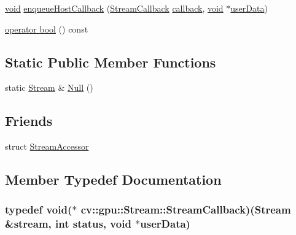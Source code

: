 \begin{DoxyCompactItemize}
\hyperlink{legacy_8hpp_a8bb47f092d473522721002c86c13b94e}{void} \hyperlink{classcv_1_1gpu_1_1Stream_aa1f21a082a9c7d280242b8861e9faf0f}{enqueue\-Host\-Callback} (\hyperlink{classcv_1_1gpu_1_1Stream_aaf3251f51e57223ddd46c62bd63af3eb}{Stream\-Callback} \hyperlink{highgui__c_8h_ad88d317ce299d78e0af7c341474a66cb}{callback}, \hyperlink{legacy_8hpp_a8bb47f092d473522721002c86c13b94e}{void} $\ast$\hyperlink{legacy_8hpp_ae6d7787b8c860038ffa2f009134ec73e}{user\-Data})
\item 
\hyperlink{classcv_1_1gpu_1_1Stream_a33ff19068eec638b8888b36a29d051c4}{operator bool} () const 
\end{DoxyCompactItemize}
\subsection*{Static Public Member Functions}
\begin{DoxyCompactItemize}
\item 
static \hyperlink{classcv_1_1gpu_1_1Stream}{Stream} \& \hyperlink{classcv_1_1gpu_1_1Stream_af96c23564834f88333dcb8997df553f1}{Null} ()
\end{DoxyCompactItemize}
\subsection*{Friends}
\begin{DoxyCompactItemize}
\item 
struct \hyperlink{classcv_1_1gpu_1_1Stream_a8362b5c9fdffe61e694647684353b090}{Stream\-Accessor}
\end{DoxyCompactItemize}


\subsection{Member Typedef Documentation}
\hypertarget{classcv_1_1gpu_1_1Stream_aaf3251f51e57223ddd46c62bd63af3eb}{
\subsubsection[{Stream\-Callback}]{\setlength{\rightskip}{0pt plus 5cm}typedef {\bf void}($\ast$ cv\-::gpu\-::\-Stream\-::\-Stream\-Callback)({\bf Stream} \&stream, int {\bf status}, {\bf void} $\ast${\bf user\-Data})}}\label{classcv_1_1gpu_1_1Stream_aaf3251f51e57223ddd46c62bd63af3eb}


